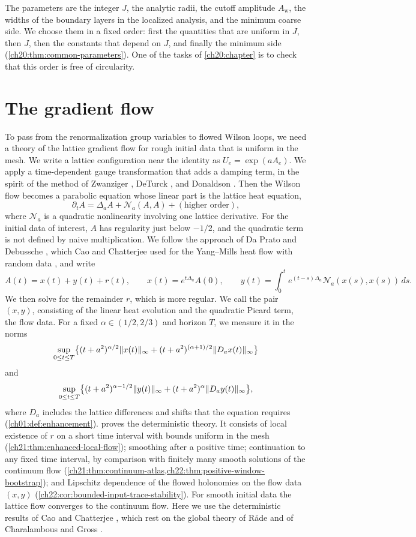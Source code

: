 The parameters are the integer $J$, the analytic radii, the cutoff amplitude $A_{\mathrm w}$, the widths of the boundary layers in the localized analysis, and the minimum coarse side. We choose them in a fixed order: first the quantities that are uniform in $J$, then $J$, then the constants that depend on $J$, and finally the minimum side (\cref{ch20:thm:common-parameters}). One of the tasks of \cref{ch20:chapter} is to check that this order is free of circularity.

\section{The gradient flow}\label{s3:flow}

To pass from the renormalization group variables to flowed Wilson loops, we need a theory of the lattice gradient flow for rough initial data that is uniform in the mesh. We write a lattice configuration near the identity as $U_e=\exp(aA_e)$. We apply a time-dependent gauge transformation that adds a damping term, in the spirit of the method of Zwanziger \cite{Zwanziger1981}, DeTurck \cite{DeTurck1983}, and Donaldson \cite{Donaldson1985}. Then the Wilson flow becomes a parabolic equation whose linear part is the lattice heat equation,
\[
 \partial_tA=\Delta_aA+\mathcal N_a(A,A)+(\text{higher order}),
\]
where $\mathcal N_a$ is a quadratic nonlinearity involving one lattice derivative. For the initial data of interest, $A$ has regularity just below $-1/2$, and the quadratic term is not defined by naive multiplication. We follow the approach of Da Prato and Debussche \cite{DaPratoDebussche2003}, which Cao and Chatterjee used for the Yang--Mills heat flow with random data \cite{CCHeat2022v4}, and write
\[
 A(t)=x(t)+y(t)+r(t),\qquad x(t)=e^{t\Delta_a}A(0),\qquad y(t)=\int_0^te^{(t-s)\Delta_a}\mathcal N_a(x(s),x(s))\,ds.
\]
We then solve for the remainder $r$, which is more regular. We call the pair $(x,y)$, consisting of the linear heat evolution and the quadratic Picard term, the flow data. For a fixed $\alpha\in(1/2,2/3)$ and horizon $T$, we measure it in the norms
\[
 \sup_{0\le t\le T}\bigl\{(t+a^2)^{\alpha/2}\lVert x(t)\rVert_\infty+(t+a^2)^{(\alpha+1)/2}\lVert D_ax(t)\rVert_\infty\bigr\}
\]
and
\[
 \sup_{0\le t\le T}\bigl\{(t+a^2)^{\alpha-1/2}\lVert y(t)\rVert_\infty+(t+a^2)^{\alpha}\lVert D_ay(t)\rVert_\infty\bigr\},
\]
where $D_a$ includes the lattice differences and shifts that the equation requires (\cref{ch01:def:enhancement}).  proves the deterministic theory. It consists of local existence of $r$ on a short time interval with bounds uniform in the mesh (\cref{ch21:thm:enhanced-local-flow}); smoothing after a positive time; continuation to any fixed time interval, by comparison with finitely many smooth solutions of the continuum flow (\cref{ch21:thm:continuum-atlas,ch22:thm:positive-window-bootstrap}); and Lipschitz dependence of the flowed holonomies on the flow data $(x,y)$ (\cref{ch22:cor:bounded-input-trace-stability}). For smooth initial data the lattice flow converges to the continuum flow. Here we use the deterministic results of Cao and Chatterjee \cite{CCHeat2022v4,CCState2023v4}, which rest on the global theory of R\aa de \cite{Rade1992} and of Charalambous and Gross \cite{CharalambousGross2013}.

